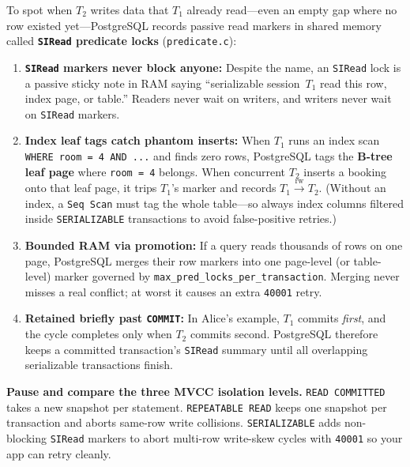 To spot when $T_2$ writes data that $T_1$ already read---even an empty gap where no row existed yet---PostgreSQL records passive read markers in shared memory called \textbf{\texttt{SIRead} predicate locks} (\texttt{predicate.c}):
\begin{enumerate}
  \item \textbf{\texttt{SIRead} markers never block anyone:} Despite the name, an \texttt{SIRead} lock is a passive sticky note in RAM saying ``serializable session~$T_1$ read this row, index page, or table.'' Readers never wait on writers, and writers never wait on \texttt{SIRead} markers.
  \item \textbf{Index leaf tags catch phantom inserts:} When $T_1$ runs an index scan \texttt{WHERE room = 4 AND ...} and finds zero rows, PostgreSQL tags the \textbf{B-tree leaf page} where \texttt{room = 4} belongs. When concurrent $T_2$ inserts a booking onto that leaf page, it trips $T_1$'s marker and records $T_1 \xrightarrow{\mathrm{rw}} T_2$. (Without an index, a \texttt{Seq Scan} must tag the whole table---so always index columns filtered inside \texttt{SERIALIZABLE} transactions to avoid false-positive retries.)
  \item \textbf{Bounded RAM via promotion:} If a query reads thousands of rows on one page, PostgreSQL merges their row markers into one page-level (or table-level) marker governed by \texttt{max\_pred\_locks\_per\_transaction}. Merging never misses a real conflict; at worst it causes an extra \texttt{40001} retry.
  \item \textbf{Retained briefly past \texttt{COMMIT}:} In Alice's example, $T_1$ commits \emph{first}, and the cycle completes only when $T_2$ commits second. PostgreSQL therefore keeps a committed transaction's \texttt{SIRead} summary until all overlapping serializable transactions finish.
\end{enumerate}

\begin{recoverybox}
\textbf{Pause and compare the three MVCC isolation levels.} \texttt{READ COMMITTED} takes a new snapshot per statement. \texttt{REPEATABLE READ} keeps one snapshot per transaction and aborts same-row write collisions. \texttt{SERIALIZABLE} adds non-blocking \texttt{SIRead} markers to abort multi-row write-skew cycles with \texttt{40001} so your app can retry cleanly.
\end{recoverybox}

